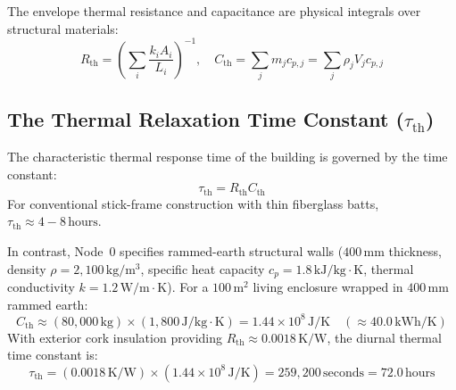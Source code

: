 The envelope thermal resistance and capacitance are physical integrals over structural materials:
\begin{equation}
R_{\mathrm{th}} = \left( \sum_{i} \frac{k_i A_i}{L_i} \right)^{-1}, \quad C_{\mathrm{th}} = \sum_{j} m_j c_{p,j} = \sum_{j} \rho_j V_j c_{p,j}
\label{eq:r_th_c_th_definitions}
\end{equation}

\subsection{The Thermal Relaxation Time Constant \texorpdfstring{($\tau_{\mathrm{th}}$)}{(tau\_th)}}
The characteristic thermal response time of the building is governed by the time constant:
\begin{equation}
\tau_{\mathrm{th}} = R_{\mathrm{th}} C_{\mathrm{th}}
\label{eq:thermal_tau}
\end{equation}
For conventional stick-frame construction with thin fiberglass batts, $\tau_{\mathrm{th}} \approx 4 - 8\,\mathrm{hours}$. 

In contrast, Node~0 specifies rammed-earth structural walls ($400\,\mathrm{mm}$ thickness, density $\rho = 2,100\,\mathrm{kg/m^3}$, specific heat capacity $c_p = 1.8\,\mathrm{kJ/kg\cdot K}$, thermal conductivity $k = 1.2\,\mathrm{W/m\cdot K}$). For a $100\,\mathrm{m^2}$ living enclosure wrapped in $400\,\mathrm{mm}$ rammed earth:
\begin{equation}
C_{\mathrm{th}} \approx (80,000\,\mathrm{kg}) \times (1,800\,\mathrm{J/kg\cdot K}) = 1.44 \times 10^8\,\mathrm{J/K} \quad (\approx 40.0\,\mathrm{kWh/K})
\label{eq:rammed_earth_c}
\end{equation}
With exterior cork insulation providing $R_{\mathrm{th}} \approx 0.0018\,\mathrm{K/W}$, the diurnal thermal time constant is:
\begin{equation}
\tau_{\mathrm{th}} = (0.0018\,\mathrm{K/W}) \times (1.44 \times 10^8\,\mathrm{J/K}) = 259,200\,\mathrm{seconds} = 72.0\,\mathrm{hours}
\label{eq:rammed_earth_tau_calc}
\end{equation}

